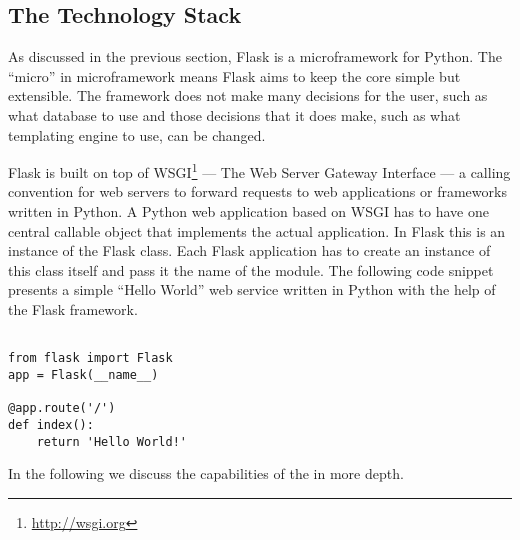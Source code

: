 


\subsection{The Technology Stack}
\label{sec:flask}

 As discussed in the previous section, Flask is a microframework for Python. 
 The ``micro'' in microframework means Flask aims to keep the core simple but extensible. 
 The framework does not make many decisions for the user, such as what database to use and
 those decisions that it does make, such as what templating engine to use, can be changed. 

 Flask is built on top of WSGI\footnote{\url{http://wsgi.org}} --- The Web Server Gateway Interface --- a calling convention for web servers to forward requests to web applications or frameworks written in Python. A Python web application based on WSGI has to have one central callable object that implements the actual application. In Flask this is an instance of the Flask class. Each Flask application has to create an instance of this class itself and pass it the name of the module. The following code snippet presents a simple ``Hello World'' web service written in Python with the help of the Flask framework. 

\begin{lstlisting}[style=custompython]

from flask import Flask
app = Flask(__name__)

@app.route('/')
def index():
    return 'Hello World!'

\end{lstlisting}

In the following we discuss the capabilities of the \tool in more depth.




